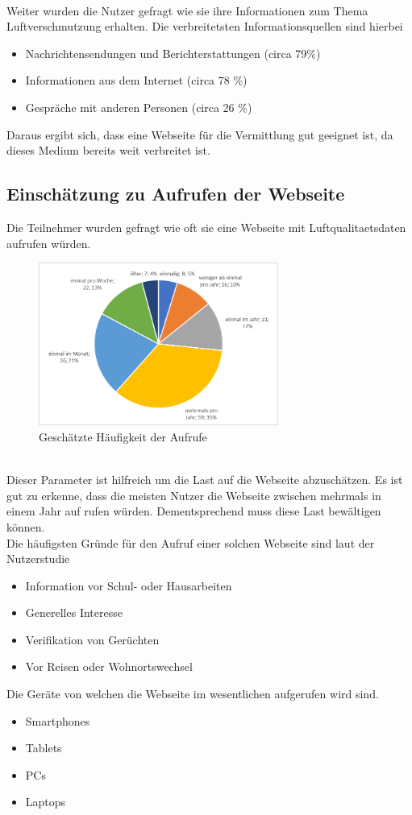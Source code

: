 \\
Weiter wurden die Nutzer gefragt wie sie ihre Informationen zum Thema \gls{Luftverschmutzung} erhalten. Die verbreitetsten Informationsquellen sind hierbei
\begin{itemize} [noitemsep]
    \item Nachrichtensendungen und Berichterstattungen (circa 79\%)
    \item Informationen aus dem Internet (circa 78 \%)
    \item Gespräche mit anderen Personen (circa 26 \%)
\end{itemize}
Daraus ergibt sich, dass eine Webseite für die Vermittlung gut geeignet ist, da dieses Medium bereits weit verbreitet ist.

\subsection{Einschätzung zu Aufrufen der Webseite}
Die Teilnehmer wurden gefragt wie oft sie eine Webseite mit \gls{Luftqualitaetsdaten} aufrufen würden.
\\
\begin{figure}[h]
    \centering
    \includegraphics[width=0.7\textwidth]{media/diagram/aufrufe.png}
    \caption{Geschätzte Häufigkeit der Aufrufe}
\end{figure}
\\
Dieser Parameter ist hilfreich um die Last auf die Webseite abzuschätzen.
Es ist gut zu erkenne, dass die meisten Nutzer die Webseite zwischen mehrmals in einem Jahr auf rufen würden.
Dementsprechend muss \softwarename diese Last bewältigen können.
\\
Die häufigsten Gründe für den Aufruf einer solchen Webseite sind laut der Nutzerstudie
\begin{itemize} [noitemsep]
    \item Information vor Schul- oder Hausarbeiten
    \item Generelles Interesse
    \item Verifikation von Gerüchten
    \item Vor Reisen oder Wohnortswechsel
\end{itemize}
Die Geräte von welchen die Webseite im wesentlichen aufgerufen wird sind.
\begin{itemize} [noitemsep]
    \item Smartphones
    \item Tablets
    \item PCs
    \item Laptops
\end{itemize}

